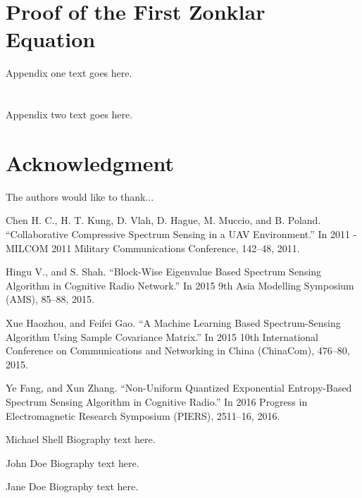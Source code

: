 \documentclass[twocolumn,twoside]{IEEEtran}                 %
\begin{document}
\appendices
\section{Proof of the First Zonklar Equation}
Appendix one text goes here.


\section{}
Appendix two text goes here.


\section*{Acknowledgment}

The authors would like to thank...

\ifCLASSOPTIONcaptionsoff
  \newpage
\fi



\begin{thebibliography}{1}

Chen H. C., H. T. Kung, D. Vlah, D. Hague, M. Muccio, and B. Poland. “Collaborative Compressive Spectrum Sensing in a UAV Environment.” In 2011 - MILCOM 2011 Military Communications Conference, 142–48, 2011.

Hingu V., and S. Shah. “Block-Wise Eigenvalue Based Spectrum Sensing Algorithm in Cognitive Radio Network.” In 2015 9th Asia Modelling Symposium (AMS), 85–88, 2015.

Xue Haozhou, and Feifei Gao. “A Machine Learning Based Spectrum-Sensing Algorithm Using Sample Covariance Matrix.” In 2015 10th International Conference on Communications and Networking in China (ChinaCom), 476–80, 2015.

Ye Fang, and Xun Zhang. “Non-Uniform Quantized Exponential Entropy-Based Spectrum Sensing Algorithm in Cognitive Radio.” In 2016 Progress in Electromagnetic Research Symposium (PIERS), 2511–16, 2016.

\end{thebibliography}


\begin{IEEEbiography}{Michael Shell}
Biography text here.
\end{IEEEbiography}

\begin{IEEEbiographynophoto}{John Doe}
Biography text here.
\end{IEEEbiographynophoto}


\begin{IEEEbiographynophoto}{Jane Doe}
Biography text here.
\end{IEEEbiographynophoto}
\end{document}
